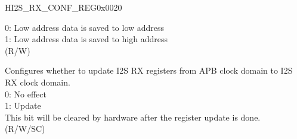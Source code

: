 \begin{register}{H}{I2S\_RX\_CONF\_REG}{0x0020}
\begin{regdesc}
\begin{reglist}
0: Low address data is saved to low address\\
1: Low address data is saved to high address\\
(R/W)
\label{fielddesc:I2SRXUPDATE}\item [I2S\_RX\_UPDATE] Configures whether to update I2S RX registers from APB clock domain to I2S RX clock domain. \\
0: No effect\\
1: Update\\
This bit will be cleared by hardware after the register update is done. \\
(R/W/SC)

\item [Continued on the next page...]
\end{reglist}\end{regdesc}
\end{register}
\addtocounter{Regfloat}{-1}
